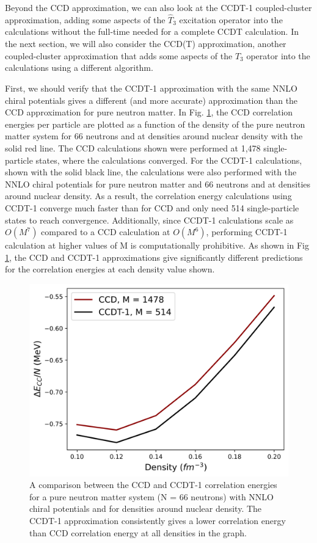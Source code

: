 Beyond the CCD approximation, we can also look at the CCDT-1 coupled-cluster approximation, adding some aspects of the $\hat{T}_3$ excitation operator into the calculations without the full-time needed for a complete CCDT calculation. In the next section, we will also consider the CCD(T) approximation, another coupled-cluster approximation that adds some aspects of the $\hat{T}_3$ operator into the calculations using a different algorithm.

First, we should verify that the CCDT-1 approximation with the same NNLO chiral potentials gives a different (and more accurate) approximation than the CCD approximation for pure neutron matter. In Fig. \ref{fig:ccd_vs_ccdt1}, the CCD correlation energies per particle are plotted as a function of the density of the pure neutron matter system for 66 neutrons and at densities around nuclear density with the solid red line. The CCD calculations shown were performed at 1,478 single-particle states, where the calculations converged. For the CCDT-1 calculations, shown with the solid black line, the calculations were also performed with the NNLO chiral potentials for pure neutron matter and 66 neutrons and at densities around nuclear density. As a result, the correlation energy calculations using CCDT-1 converge much faster than for CCD and only need 514 single-particle states to reach convergence. Additionally, since CCDT-1 calculations scale as $O(M^7)$ compared to a CCD calculation at $O(M^6)$, performing CCDT-1 calculation at higher values of M is computationally prohibitive. As shown in Fig \ref{fig:ccd_vs_ccdt1}, the CCD and CCDT-1 approximations give significantly different predictions for the correlation energies at each density value shown.

\begin{figure}
    \centering
    \includegraphics[scale=0.75]{Images/Chapter7/ORNL/ccdt1_nuclear_neutron_matter_no_ML.png}
    \caption{A comparison between the CCD and CCDT-1 correlation energies for a pure neutron matter system (N = 66 neutrons) with NNLO chiral potentials and for densities around nuclear density.  The CCDT-1 approximation consistently gives a lower correlation energy than CCD correlation energy at all densities in the graph.}
    \label{fig:ccd_vs_ccdt1}
\end{figure}

